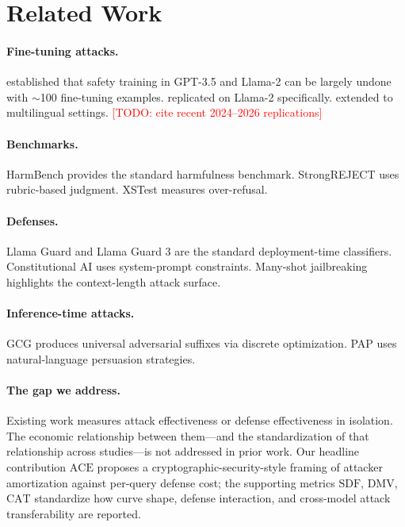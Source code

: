 \documentclass[11pt,letterpaper]{article}
\newcommand{\ACE}{\mathrm{ACE}}
\newcommand{\SDF}{\mathrm{SDF}}
\newcommand{\DMV}{\mathrm{DMV}}
\newcommand{\CAT}{\mathrm{CAT}}
\newcommand{\TODO}[1]{\textcolor{red}{[TODO: #1]}}
\begin{document}
\section{Related Work}
\label{sec:related}

\paragraph{Fine-tuning attacks.} \citet{qi2023finetuning} established that
safety training in GPT-3.5 and Llama-2 can be largely undone with
$\sim$100 fine-tuning examples. \citet{gade2023badllama} replicated on
Llama-2 specifically. \citet{yang2023shadow} extended to multilingual
settings. \TODO{cite recent 2024--2026 replications}

\paragraph{Benchmarks.} HarmBench \citep{mazeika2024harmbench} provides the
standard harmfulness benchmark. StrongREJECT \citep{souly2024strongreject}
uses rubric-based judgment. XSTest \citep{rottger2024xstest} measures
over-refusal.

\paragraph{Defenses.} Llama Guard \citep{inan2023llamaguard} and Llama Guard 3
\citep{meta2024llamaguard3} are the standard deployment-time classifiers.
Constitutional AI \citep{bai2022constitutional} uses system-prompt
constraints. Many-shot jailbreaking \citep{anil2024manyshot} highlights the
context-length attack surface.

\paragraph{Inference-time attacks.} GCG \citep{zou2023universal} produces
universal adversarial suffixes via discrete optimization. PAP
\citep{zeng2024persuasion} uses natural-language persuasion strategies.

\paragraph{The gap we address.} Existing work measures attack effectiveness
or defense effectiveness in isolation. The economic relationship between
them---and the standardization of that relationship across studies---is
not addressed in prior work. Our headline contribution $\ACE$ proposes
a cryptographic-security-style framing of attacker amortization against
per-query defense cost; the supporting metrics $\SDF$, $\DMV$, $\CAT$
standardize how curve shape, defense interaction, and cross-model attack
transferability are reported.
\end{document}

